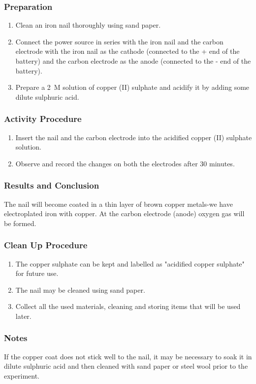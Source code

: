 \subsubsection*{Preparation}
\begin{enumerate}
\item{Clean an iron nail thoroughly using sand paper.}
\item{Connect the power source in series with the iron nail and the carbon electrode with the iron nail as the cathode (connected to the + end of the battery) and the carbon electrode as the anode (connected to the - end of the battery).}
\item{Prepare a 2~M solution of copper (II) sulphate and acidify it by adding some dilute sulphuric acid.}
\end{enumerate}

\subsubsection*{Activity Procedure}
\begin{enumerate}
\item{Insert the nail and the carbon electrode into the acidified copper (II) sulphate solution.}
\item{Observe and record the changes on both the electrodes after 30 minutes.}
\end{enumerate}

\subsubsection*{Results and Conclusion}
The nail will become coated in a thin layer of brown copper metals-we have electroplated iron with copper. At the carbon electrode (anode) oxygen gas will be formed.

\subsubsection*{Clean Up Procedure}
\begin{enumerate}
\item{The copper sulphate can be kept and labelled as "acidified copper sulphate" for future use.}
\item{The nail may be cleaned using sand paper.}
\item{Collect all the used materials, cleaning and storing items that will be used later.}
\end{enumerate}

\subsubsection*{Notes}
If the copper coat does not stick well to the nail, it may be necessary to soak it in dilute sulphuric acid and then cleaned with sand paper or steel wool prior to the experiment.